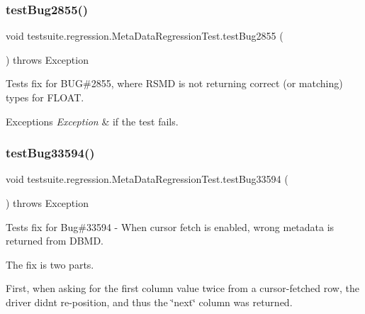 \subsubsection{\texorpdfstring{test\+Bug2855()}{testBug2855()}}
{\footnotesize\ttfamily void testsuite.\+regression.\+Meta\+Data\+Regression\+Test.\+test\+Bug2855 (\begin{DoxyParamCaption}{ }\end{DoxyParamCaption}) throws Exception}

Tests fix for B\+UG\#2855, where R\+S\+MD is not returning correct (or matching) types for F\+L\+O\+AT.


\begin{DoxyExceptions}{Exceptions}
{\em Exception} & if the test fails. \\
\hline
\end{DoxyExceptions}
\mbox{\label{classtestsuite_1_1regression_1_1_meta_data_regression_test_adb0cee1c23451feae0c5ee851ee0d5ba}} 
\subsubsection{\texorpdfstring{test\+Bug33594()}{testBug33594()}}
{\footnotesize\ttfamily void testsuite.\+regression.\+Meta\+Data\+Regression\+Test.\+test\+Bug33594 (\begin{DoxyParamCaption}{ }\end{DoxyParamCaption}) throws Exception}

Tests fix for Bug\#33594 -\/ When cursor fetch is enabled, wrong metadata is returned from D\+B\+MD.

The fix is two parts.

First, when asking for the first column value twice from a cursor-\/fetched row, the driver didn\textquotesingle{}t re-\/position, and thus the \char`\"{}next\char`\"{} column was returned.

